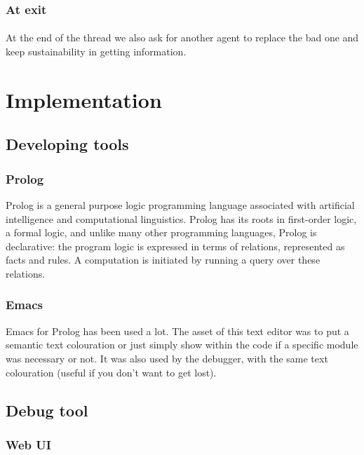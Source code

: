 \documentclass{article}
\begin{document}
		\subsubsection{At exit}
		\paragraph{}
		At the end of the thread we also ask for another agent to replace the bad one and keep sustainability in getting information.

\section{Implementation}
	\subsection{Developing tools}
		\subsubsection{Prolog}
			Prolog is a general purpose logic programming language associated with artificial intelligence and computational linguistics.
			Prolog has its roots in first-order logic, a formal logic, and unlike many other programming languages,
			Prolog is declarative: the program logic is expressed in terms of relations, represented as facts and rules.
			A computation is initiated by running a query over these relations.
		\subsubsection{Emacs}
		Emacs for Prolog has been used a lot.
		The asset of this text editor was to put a semantic text colouration
		or just simply show within the code if a specific module was necessary or not.
		It was also used by the debugger, with the same text colouration (useful if you don't want to get lost).
	\subsection{Debug tool}
		\subsubsection{Web UI}
\end{document}
